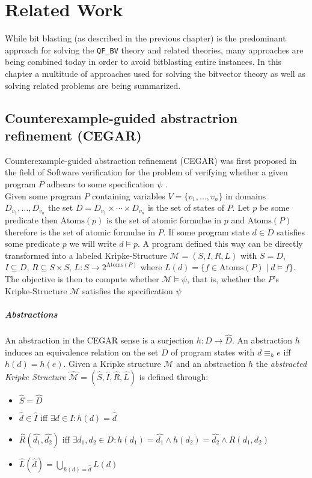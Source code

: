 \chapter{Related Work}
\label{ch:related_work}
While bit blasting (as described in the previous chapter) is the predominant approach for solving the \texttt{QF\_BV} theory and related theories, many approaches are being combined today in order to avoid bitblasting entire instances.
In this chapter a multitude of approaches used for solving the bitvector theory as well as solving related problems are being summarized. 

\section{Counterexample-guided abstractrion refinement (CEGAR)}
Counterexample-guided abstraction refinement (CEGAR) was first proposed in the field of Software verification for the problem of verifying whether a given program $P$ adhears to some specification $\psi$ \cite{CEGAR}.\\
Given some program $P$ containing variables $V=\{v_1,\dots,v_n\}$ in domains $D_{v_1},\dots,D_{v_n}$ the set $D=D_{v_1}\times\dotsi\times D_{v_n}$ is the set of states of $P$. Let $p$ be some predicate then $\text{Atoms}\left(p\right)$ is the set of atomic formulae in $p$ and $\text{Atoms}\left(P\right)$ therefore is the set of atomic formulae in $P$. If some program state $d\in D$ satisfies some predicate $p$ we will write $d\vDash p$. A program defined this way can be directly transformed into a labeled Kripke-Structure $\mathcal{M}=\left(S,I,R,L\right)$ with $S=D$, $I\subseteq D$, $R \subseteq S \times S$, $L\colon S \to 2^{\text{Atoms}\left(P\right)}$ where $L\left(d\right) = \{ f \in \text{Atoms}\left(P\right) \mid d \vDash f \}$. The objective is then to compute whether $\mathcal{M}\vDash\psi$, that is, whether the $P$'s Kripke-Structure $\mathcal{M}$ satisfies the specification $\psi$
\paragraph{Abstractions}
An abstraction in the CEGAR sense is a surjection $h\colon D \to \hat{D}$. An abstraction $h$ induces an equivalence relation on the set $D$ of program states with $d \equiv_h e$ iff $h\left(d\right) = h\left(e\right)$. Given a Kripke structure $\mathcal{M}$ and an abstraction $h$ the \textit{abstracted Kripke Structure} $\hat{\mathcal{M}} = \left(\hat{S},\hat{I},\hat{R},\hat{L}\right)$ is defined through:
\begin{itemize}
    \item $\hat{S} = \hat{D}$
    \item $\hat{d} \in \hat{I}$ iff $\exists d \in I\colon h\left(d\right) = \hat{d}$
    \item $\hat{R}\left(\hat{d_1},\hat{d_2}\right)$ iff $\exists d_1,d_2 \in D\colon h\left(d_1\right) = \hat{d_1} \land h\left(d_2\right) = \hat{d_2} \land R\left(d_1, d_2\right)$
    \item $\hat{L}\left(\hat{d}\right)=\bigcup\limits_{h\left(d\right)=\hat{d}} L\left(d\right)$
\end{itemize}

